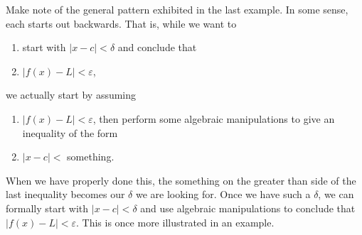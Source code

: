 








Make note of the general pattern exhibited in the last example. In some sense, each starts out backwards. That is, while we want to
\begin{enumerate}
	\item start with $|x-c|<\delta$ and conclude that
	\item $|f(x)-L|<\varepsilon$,
\end{enumerate}
we actually start by assuming 
\begin{enumerate}
	\item $|f(x)-L|<\varepsilon$, then perform some algebraic manipulations to give an inequality of the form
	\item $|x-c|<$ something.
\end{enumerate} 
When we have properly done this, the something on the greater than side of the last inequality becomes our $\delta$ we are looking for. Once we have such a $\delta$, we can formally start with $|x-c|<\delta$ and use algebraic manipulations to conclude that $|f(x)-L|<\varepsilon$. This is once more illustrated in an example. 


